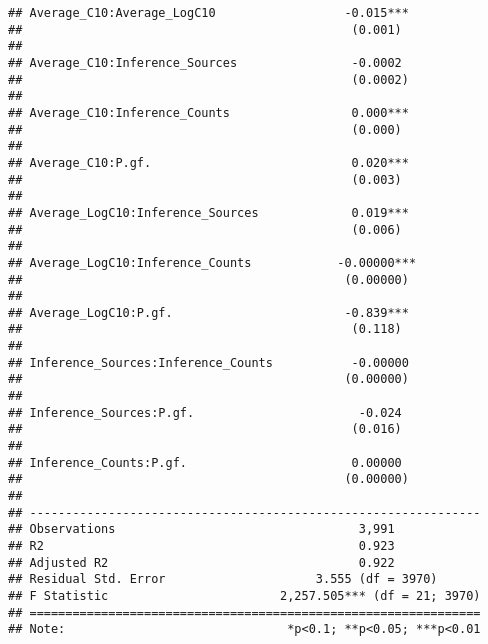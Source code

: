 \documentclass[
]{article}
\begin{document}
\begin{verbatim}
## Average_C10:Average_LogC10                  -0.015***          
##                                              (0.001)           
##                                                                
## Average_C10:Inference_Sources                -0.0002           
##                                              (0.0002)          
##                                                                
## Average_C10:Inference_Counts                 0.000***          
##                                              (0.000)           
##                                                                
## Average_C10:P.gf.                            0.020***          
##                                              (0.003)           
##                                                                
## Average_LogC10:Inference_Sources             0.019***          
##                                              (0.006)           
##                                                                
## Average_LogC10:Inference_Counts            -0.00000***         
##                                             (0.00000)          
##                                                                
## Average_LogC10:P.gf.                        -0.839***          
##                                              (0.118)           
##                                                                
## Inference_Sources:Inference_Counts           -0.00000          
##                                             (0.00000)          
##                                                                
## Inference_Sources:P.gf.                       -0.024           
##                                              (0.016)           
##                                                                
## Inference_Counts:P.gf.                       0.00000           
##                                             (0.00000)          
##                                                                
## ---------------------------------------------------------------
## Observations                                  3,991            
## R2                                            0.923            
## Adjusted R2                                   0.922            
## Residual Std. Error                     3.555 (df = 3970)      
## F Statistic                        2,257.505*** (df = 21; 3970)
## ===============================================================
## Note:                               *p<0.1; **p<0.05; ***p<0.01
\end{verbatim}
\end{document}
